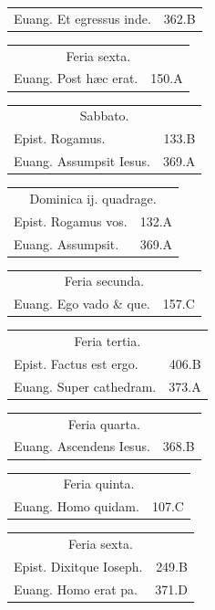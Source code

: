 \documentclass[a5paper,10pt]{book}
\def\ae{æ}
\begin{document}
\begin{multicols}{2}
\begin{tabular}{l r}
Euang. Et egressus inde. & 362.B\\
\end{tabular}
\begin{tabular}{l r}
\multicolumn{2}{c}{\color{red} Feria sexta.}\\
Euang. Post h\ae c erat. & 150.A\\
\end{tabular}
\begin{tabular}{l r}
\multicolumn{2}{c}{\color{red} Sabbato.}\\
Epist. Rogamus. & 133.B\\
Euang. Assumpsit Iesus. & 369.A\\
\end{tabular}
\begin{tabular}{l r}
\multicolumn{2}{c}{\color{red} Dominica ij. quadrage.}\\
Epist. Rogamus vos. & 132.A\\
Euang. Assumpsit. & 369.A\\
\end{tabular}
\begin{tabular}{l r}
\multicolumn{2}{c}{\color{red} Feria secunda.}\\
Euang. Ego vado \& que. & 157.C\\
\end{tabular}
\begin{tabular}{l r}
\multicolumn{2}{c}{\color{red} Feria tertia.}\\
Epist. Factus est ergo. & 406.B\\
Euang. Super cathedram. & 373.A\\
\end{tabular}
\begin{tabular}{l r}
\multicolumn{2}{c}{\color{red} Feria quarta.}\\
Euang. Ascendens Iesus. & 368.B\\
\end{tabular}
\begin{tabular}{l r}
\multicolumn{2}{c}{\color{red} Feria quinta.}\\
Euang. Homo quidam. & 107.C\\
\end{tabular}
\begin{tabular}{l r}
\multicolumn{2}{c}{\color{red} Feria sexta.}\\
Epist. Dixitque Ioseph. & 249.B\\
Euang. Homo erat pa. & 371.D\\
\end{tabular}

\end{multicols}
\end{document}
